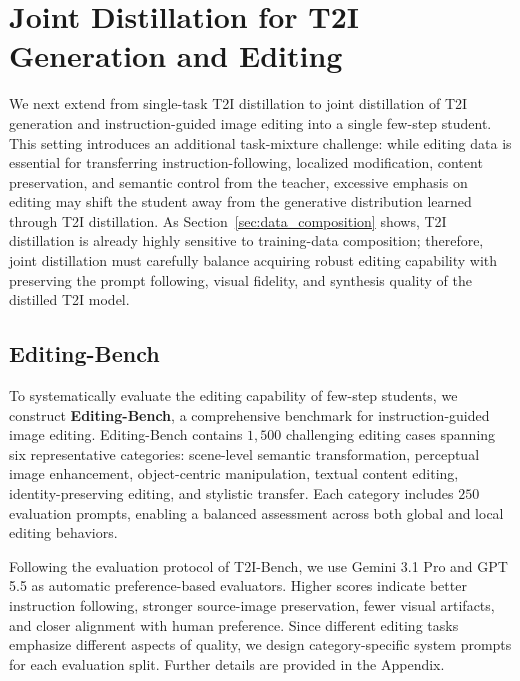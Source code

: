 \documentclass{article}
\begin{document}
\section{Joint Distillation for T2I Generation and Editing}
We next extend from single-task T2I distillation to joint distillation of T2I generation and instruction-guided image editing into a single few-step student. This setting introduces an additional task-mixture challenge: while editing data is essential for transferring instruction-following, localized modification, content preservation, and semantic control from the teacher, excessive emphasis on editing may shift the student away from the generative distribution learned through T2I distillation. As Section~\ref{sec:data_composition} shows, T2I distillation is already highly sensitive to training-data composition; therefore, joint distillation must carefully balance acquiring robust editing capability with preserving the prompt following, visual fidelity, and synthesis quality of the distilled T2I model.


\subsection{Editing-Bench}
To systematically evaluate the editing capability of few-step students, we construct \textbf{Editing-Bench}, a comprehensive benchmark for instruction-guided image editing. Editing-Bench contains $1,500$ challenging editing cases spanning six representative categories: scene-level semantic transformation, perceptual image enhancement, object-centric manipulation, textual content editing, identity-preserving editing, and stylistic transfer. Each category includes $250$ evaluation prompts, enabling a balanced assessment across both global and local editing behaviors. 

Following the evaluation protocol of T2I-Bench, we use Gemini 3.1 Pro and GPT 5.5 as automatic preference-based evaluators. Higher scores indicate better instruction following, stronger source-image preservation, fewer visual artifacts, and closer alignment with human preference. Since different editing tasks emphasize different aspects of quality, we design category-specific system prompts for each evaluation split. Further details are provided in the Appendix.
\end{document}
